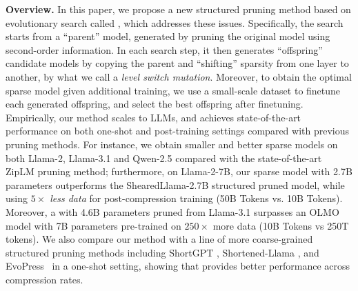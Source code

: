 \noindent\textbf{Overview.} In this paper, we propose a new structured pruning method based on evolutionary search called \sysname{}, which addresses these issues. 
Specifically, the search starts from a ``parent'' model, generated by pruning the original model using second-order information. In each search step, it then generates ``offspring'' candidate models by copying the parent and ``shifting'' sparsity from one layer to another, by what we call a \emph{level switch mutation}. Moreover, to obtain the optimal sparse model given additional training, we use a small-scale dataset to finetune each generated offspring, and select the best offspring after finetuning. Empirically, our method scales to LLMs, and achieves state-of-the-art performance on both one-shot and post-training settings compared with previous pruning methods. For instance, we obtain smaller and better sparse models on both Llama-2, Llama-3.1 and Qwen-2.5 compared with the state-of-the-art ZipLM pruning method; furthermore, on Llama-2-7B, our sparse model with 2.7B parameters outperforms the ShearedLlama-2.7B structured pruned model, while using  \emph{$5\times$ less data} for post-compression training (50B Tokens vs. 10B Tokens). Moreover, a \sysname with 4.6B parameters pruned from Llama-3.1 surpasses an OLMO model with 7B parameters pre-trained on $250\times$ more data (10B Tokens vs 250T tokens). We also compare our method with a line of more coarse-grained structured pruning methods including ShortGPT \citep{men2024shortgpt}, Shortened-Llama \citep{kim2024shortened}, and EvoPress~\citep{sieberling2024evopress} in a one-shot setting, showing that \sysname{} provides better performance across compression rates. 


